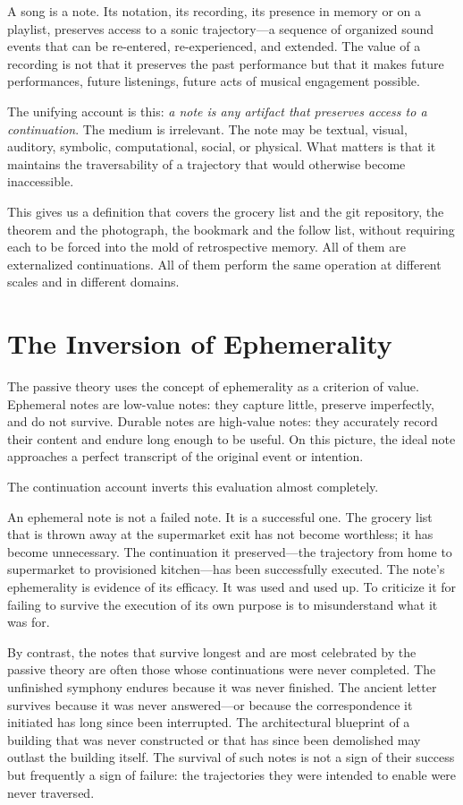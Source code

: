 \documentclass[12pt, a4paper]{article}
\begin{document}
A song is a note. Its notation, its recording, its presence in memory or on a
playlist, preserves access to a sonic trajectory---a sequence of organized
sound events that can be re-entered, re-experienced, and extended. The value of a
recording is not that it preserves the past performance but that it makes future
performances, future listenings, future acts of musical engagement possible.

The unifying account is this: \emph{a note is any artifact that preserves access
to a continuation}. The medium is irrelevant. The note may be textual, visual,
auditory, symbolic, computational, social, or physical. What matters is that it
maintains the traversability of a trajectory that would otherwise become
inaccessible.

This gives us a definition that covers the grocery list and the git repository,
the theorem and the photograph, the bookmark and the follow list, without
requiring each to be forced into the mold of retrospective memory. All of them are
externalized continuations. All of them perform the same operation at different
scales and in different domains.

\section{The Inversion of Ephemerality}

The passive theory uses the concept of ephemerality as a criterion of value.
Ephemeral notes are low-value notes: they capture little, preserve imperfectly,
and do not survive. Durable notes are high-value notes: they accurately record
their content and endure long enough to be useful. On this picture, the ideal note
approaches a perfect transcript of the original event or intention.

The continuation account inverts this evaluation almost completely.

An ephemeral note is not a failed note. It is a successful one. The grocery list
that is thrown away at the supermarket exit has not become worthless; it has become
unnecessary. The continuation it preserved---the trajectory from home to supermarket
to provisioned kitchen---has been successfully executed. The note's ephemerality
is evidence of its efficacy. It was used and used up. To criticize it for failing
to survive the execution of its own purpose is to misunderstand what it was for.

By contrast, the notes that survive longest and are most celebrated by the passive
theory are often those whose continuations were never completed. The unfinished
symphony endures because it was never finished. The ancient letter survives because
it was never answered---or because the correspondence it initiated has long since
been interrupted. The architectural blueprint of a building that was never
constructed or that has since been demolished may outlast the building itself. The
survival of such notes is not a sign of their success but frequently a sign of
failure: the trajectories they were intended to enable were never traversed.
\end{document}
